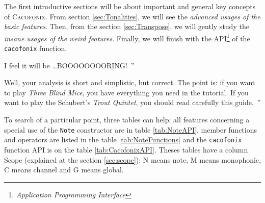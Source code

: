 \documentclass{article}
\newcommand{\cacofonix}{\textsc{Cacofonix}\xspace}
\newcommand{\note}{\lstinline!Note!\xspace}
\newenvironment{meenv}{ \par \noindent \makebox[6em][r]{ \textcolor{mecolor}{Me}: `` --~}}{~''}
\newenvironment{myselfenv}{ \par \noindent \makebox[6em][r]{ \textcolor{myselfcolor}{Myself}: `` --~}}{~''}
\newcommand{\me}[1]{\begin{meenv}#1\end{meenv}}
\newcommand{\myself}[1]{\begin{myselfenv}#1\end{myselfenv}}
\begin{document}
The first introductive sections will be about important and general key concepts of \cacofonix. From section \ref{sec:Tonalities}, we will see the \emph{advanced usages of the basic features}. Then, from the section \ref{sec:Transpose}, we will gently study the \emph{insane usages of the weird features}. Finally, we will finish with the API\footnote{\emph{Application Programming Interface}} of the \lstinline!cacofonix! function.

\me{I feel it will be \dots BOOOOOOOORING!}
\myself{Well, your analysis is short and simplistic, but correct. The point is: if you want to play \emph{Three Blind Mice}, you have everything you need in the tutorial. If you want to play the Schubert's \emph{Trout Quintet}, you should read carefully this guide.}

To search of a particular point, three tables can help: all features concerning a special use of the \note constructor are in table \ref{tab:NoteAPI}, member functions and operators are listed in the table \ref{tab:NoteFunctions} and the \lstinline!cacofonix! function API is on the table \ref{tab:CacofonixAPI}. Theses tables have a column Scope (explained at the section \ref{sec:scope}): N means note, M means monophonic, C means channel and G means global.
\end{document}
